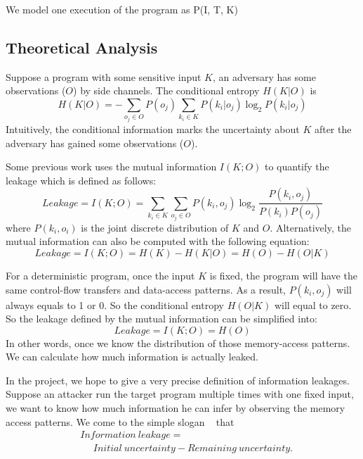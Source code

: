 We model one execution of the program as P(I, T, K)
\subsection{Theoretical Analysis}
Suppose a program with some
sensitive input $K$, an adversary has some observations ($O$) by side channels.  
  The conditional entropy $H(K|O)$ is
\begin{displaymath}
    H(K|O) = - \sum_{o_j {\in} O} {P(o_j) \sum_{k_i {\in} K}{P(k_i|o_j)\log_2P(k_i|o_j)}}
\end{displaymath}
Intuitively, the conditional information marks the uncertainty about $K$ after the adversary
has gained some observations ($O$). 

Some previous work uses the mutual information $I(K; O)$ to quantify the leakage which is defined 
as follows:
\begin{displaymath}
    \mathit{Leakage} = I(K;O) = \sum_{k_i {\in} K}{\sum_{o_j {\in} O}{P(k_i, o_j)\log_2\frac{P(k_i, o_j)}{P(k_i)P(o_j)}}}
\end{displaymath}
where $P(k_i, o_i)$ is the joint discrete distribution of $K$ and $O$.
Alternatively, the mutual information can also be computed with the following equation:
\begin{displaymath}
    \mathit{Leakage} = I(K;O) = H(K) - H(K|O) = H(O) - H(O|K)
\end{displaymath}

For a deterministic program, once the input $K$ is fixed, the program will have the same
control-flow transfers and data-access patterns. As a result, $P(k_i, o_j)$ will always
equals to 1 or 0. So the conditional entropy $H(O|K)$ will equal to zero. So the leakage defined
by the mutual information can be simplified into:
\begin{displaymath}
\label{mutual:information}
    \mathit{Leakage} = I(K;O) = H(O)
\end{displaymath}
In other words, once we know the distribution of those memory-access patterns. We can 
calculate how much information is actually leaked.

In the project, we hope to give a very precise definition of information leakages. 
Suppose an attacker run the target program multiple times with one fixed input, we
want to know how much information he can infer by observing the memory access patterns.
We come to the simple slogan ~\cite{10.1007/978-3-642-00596-1_21} %
that
\begin{align*}
 & \mathit{Information\ leakage} = \\
 & ~~~~~~ \mathit{Initial}\ \mathit{uncertainty} - \mathit{Remaining\ uncertainty}. 
\end{align*}


